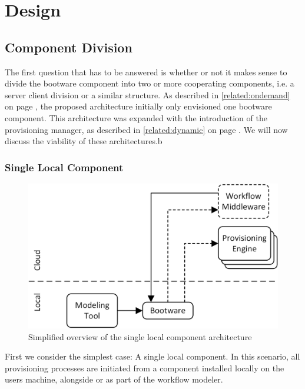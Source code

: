 \section{Design}

\subsection{Component Division}

The first question that has to be answered is whether or not it makes sense to divide the bootware component into two or more cooperating components, i.e. a server client division or a similar structure.
As described in \autoref{related:ondemand} on page \pageref{related:ondemand}, the proposed architecture initially only envisioned one bootware component.
This architecture was expanded with the introduction of the provisioning manager, as described in \autoref{related:dynamic} on page \pageref{related:dynamic}.
We will now discuss the viability of these architectures.b

\subsubsection{Single Local Component}

\begin{figure}[!htbp]
	\centering
	\includegraphics[resolution=600]{design/assets/simple_local}
	\caption{Simplified overview of the single local component architecture}
	\label{image:single_local}
\end{figure}

First we consider the simplest case: A single local component.
In this scenario, all provisioning processes are initiated from a component installed locally on the users machine, alongside or as part of the workflow modeler.

